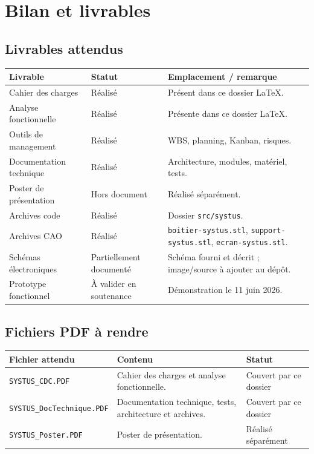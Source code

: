 \section{Bilan et livrables}

\subsection{Livrables attendus}

\begin{longtable}{|p{5cm}|p{4cm}|p{4cm}|}
\hline
\textbf{Livrable} & \textbf{Statut} & \textbf{Emplacement / remarque} \\
\hline
Cahier des charges & Réalisé & Présent dans ce dossier LaTeX. \\
\hline
Analyse fonctionnelle & Réalisé & Présente dans ce dossier LaTeX. \\
\hline
Outils de management & Réalisé & WBS, planning, Kanban, risques. \\
\hline
Documentation technique & Réalisé & Architecture, modules, matériel, tests. \\
\hline
Poster de présentation & Hors document & Réalisé séparément. \\
\hline
Archives code & Réalisé & Dossier \texttt{src/systus}. \\
\hline
Archives CAO & Réalisé & \texttt{boitier-systus.stl}, \texttt{support-systus.stl}, \texttt{ecran-systus.stl}. \\
\hline
Schémas électroniques & Partiellement documenté & Schéma fourni et décrit ; image/source à ajouter au dépôt. \\
\hline
Prototype fonctionnel & À valider en soutenance & Démonstration le 11 juin 2026. \\
\hline
\end{longtable}

\subsection{Fichiers PDF à rendre}

\begin{longtable}{|p{5cm}|p{5cm}|p{3cm}|}
\hline
\textbf{Fichier attendu} & \textbf{Contenu} & \textbf{Statut} \\
\hline
\texttt{SYSTUS\_CDC.PDF} & Cahier des charges et analyse fonctionnelle. & Couvert par ce dossier \\
\hline
\texttt{SYSTUS\_DocTechnique.PDF} & Documentation technique, tests, architecture et archives. & Couvert par ce dossier \\
\hline
\texttt{SYSTUS\_Poster.PDF} & Poster de présentation. & Réalisé séparément \\
\hline
\end{longtable}

